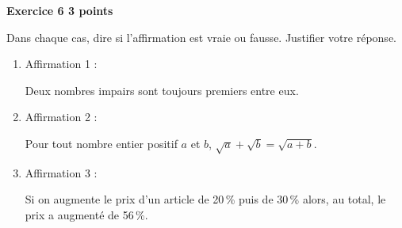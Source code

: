 \textbf{Exercice 6 \hfill 3 points}

\medskip

Dans chaque cas, dire si l'affirmation est vraie ou fausse. Justifier votre réponse.

\medskip

\begin{enumerate}
\item Affirmation 1 :

Deux nombres impairs sont toujours premiers entre eux.
\item Affirmation 2 :

Pour tout nombre entier positif $a$ et $b$, $\sqrt{a} + \sqrt{b} = \sqrt{a + b}$.
\item Affirmation 3 :

Si on augmente le prix d'un article de 20\,\% puis de 30\,\% alors, au total, le prix a
augmenté de 56\,\%.
\end{enumerate}

\bigskip

